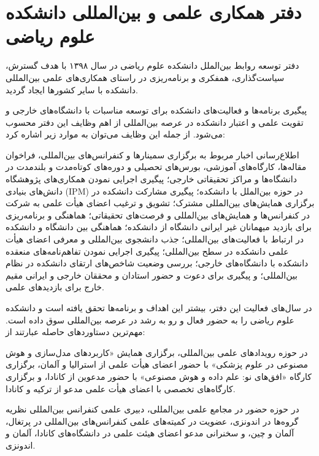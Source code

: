 \documentclass[
  letterpaper,
  DIV=11,
  numbers=noendperiod]{scrreprt}
\begin{document}
\section{دفتر همکاری علمی و بین‌المللی دانشکده علوم
ریاضی}\label{ux62fux641ux62aux631-ux647ux645ux6a9ux627ux631ux6cc-ux639ux644ux645ux6cc-ux648-ux628ux6ccux646ux627ux644ux645ux644ux644ux6cc-ux62fux627ux646ux634ux6a9ux62fux647-ux639ux644ux648ux645-ux631ux6ccux627ux636ux6cc}

دفتر توسعه روابط بین‌الملل دانشکده علوم ریاضی در سال ۱۳۹۸ با هدف گسترش،
سیاست‌گذاری، همفکری و برنامه‌ریزی در راستای همکاری‌های علمی بین‌المللی
دانشکده با سایر کشورها ایجاد گردید.

پیگیری برنامه‌ها و فعالیت‌های دانشکده برای توسعه مناسبات با دانشگاه‌های
خارجی و تقویت علمی و اعتبار دانشکده در عرصه بین‌المللی از اهم وظایف این
دفتر محسوب می‌شود. از جمله این وظایف می‌توان به موارد زیر اشاره کرد:

اطلاع‌رسانی اخبار مربوط به برگزاری سمینارها و کنفرانس‌های بین‌المللی،
فراخوان مقاله‌ها، کارگاه‌های آموزشی، بورس‌های تحصیلی و دوره‌های کوتاه‌مدت و
بلندمدت در دانشگاه‌ها و مراکز تحقیقاتی خارجی؛ پیگیری اجرایی نمودن
همکاری‌های پژوهشگاه دانش‌های بنیادی (IPM) در حوزه بین‌الملل با دانشکده؛
پیگیری مشارکت دانشکده در برگزاری همایش‌های بین‌المللی مشترک؛ تشویق و ترغیب
اعضای هیأت علمی به شرکت در کنفرانس‌ها و همایش‌های بین‌المللی و فرصت‌های
تحقیقاتی؛ هماهنگی و برنامه‌ریزی برای بازدید میهمانان غیر ایرانی دانشگاه
از دانشکده؛ هماهنگی بین دانشگاه و دانشکده در ارتباط با فعالیت‌های
بین‌المللی؛ جذب دانشجوی بین‌المللی و معرفی اعضای هیأت علمی دانشکده در سطح
بین‌المللی؛ پیگیری اجرایی نمودن تفاهم‌نامه‌های منعقده دانشکده با دانشگاه‌های
خارجی؛ بررسی وضعیت شاخص‌های ارتقای دانشکده در نظام بین‌المللی؛ و پیگیری
برای دعوت و حضور استادان و محققان خارجی و ایرانی مقیم خارج برای
بازدیدهای علمی.

در سال‌های فعالیت این دفتر، بیشتر این اهداف و برنامه‌ها تحقق یافته است و
دانشکده علوم ریاضی را به حضور فعال و رو به رشد در عرصه بین‌المللی سوق
داده است. مهم‌ترین دستاوردهای حاصله عبارتند از:

در حوزه رویدادهای علمی بین‌المللی، برگزاری همایش «کاربردهای مدل‌سازی و هوش
مصنوعی در علوم پزشکی» با حضور اعضای هیأت علمی از استرالیا و آلمان،
برگزاری کارگاه «افق‌های نو: علم داده و هوش مصنوعی» با حضور مدعوین از
کانادا، و برگزاری کارگاه‌های تخصصی با اعضای هیأت علمی مدعو از ترکیه و
کانادا.

در حوزه حضور در مجامع علمی بین‌المللی، دبیری علمی کنفرانس بین‌المللی نظریه
گروه‌ها در اندونزی، عضویت در کمیته‌های علمی کنفرانس‌های بین‌المللی در
پرتغال، آلمان و چین، و سخنرانی مدعو اعضای هیئت علمی در دانشگاه‌های
کانادا، آلمان و اندونزی.
\end{document}
